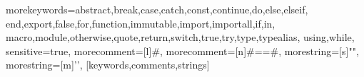 \usepackage{listings}
\usepackage[T1]{fontenc}
\usepackage{beramono}
\usepackage{listings}
\usepackage[usenames,dvipsnames]{xcolor}
  {morekeywords={abstract,break,case,catch,const,continue,do,else,elseif,
      end,export,false,for,function,immutable,import,importall,if,in,
      macro,module,otherwise,quote,return,switch,true,try,type,typealias,
      using,while},
   sensitive=true,
   morecomment=[l]\#,
   morecomment=[n]{\#=}{=\#},
   morestring=[s]{"}{"},
   morestring=[m]{'}{'},
}[keywords,comments,strings]


